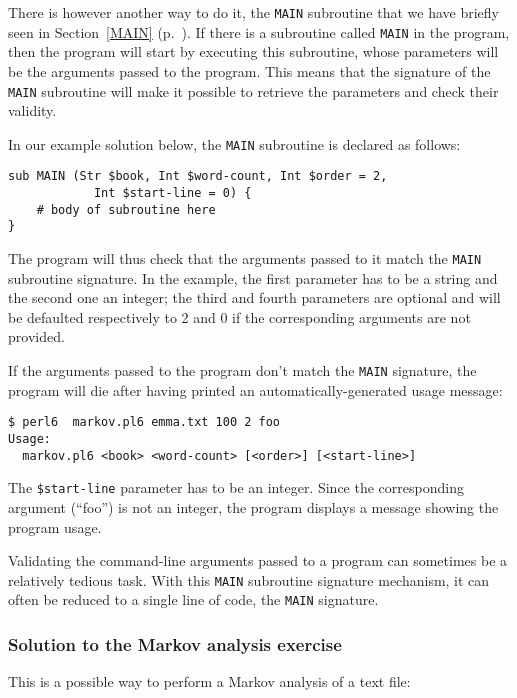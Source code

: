 There is however another way to do it, the {\tt MAIN} 
subroutine that we have briefly seen in Section~\ref{MAIN} 
(p.~\pageref{MAIN}). If there is a subroutine 
called {\tt MAIN} in the program, then the program will start 
by executing this subroutine, whose parameters will be the 
arguments passed to the program. This means that the signature 
of the {\tt MAIN} subroutine will make it possible to retrieve the 
parameters and check their validity.

In our example solution below, the {\tt MAIN} subroutine is declared 
as follows:

\begin{verbatim}
sub MAIN (Str $book, Int $word-count, Int $order = 2, 
            Int $start-line = 0) {
    # body of subroutine here
}
\end{verbatim}

The program will thus check that the arguments passed to it match 
the {\tt MAIN} subroutine signature. In the example, the first 
parameter has to be a string and the second one an integer; the 
third and fourth parameters are optional and will be defaulted 
respectively to 2 and 0 if the corresponding arguments are not 
provided.

If the arguments passed to the program don't match the {\tt MAIN} 
signature, the program will die after having printed an 
automatically-generated usage message:

\begin{verbatim}
$ perl6  markov.pl6 emma.txt 100 2 foo
Usage:
  markov.pl6 <book> <word-count> [<order>] [<start-line>]
\end{verbatim}
The \verb'$start-line' parameter has to be an integer. Since 
the corresponding argument (``foo'') is not an integer, the 
program displays a message showing the program usage.

Validating the command-line arguments passed to a program 
can sometimes be a relatively tedious task. With this 
{\tt MAIN} subroutine signature mechanism, it can often be reduced 
to a single line of code, the {\tt MAIN} signature.

\subsubsection{Solution to the Markov analysis exercise}

This is a possible way to perform a Markov analysis of a 
text file:


